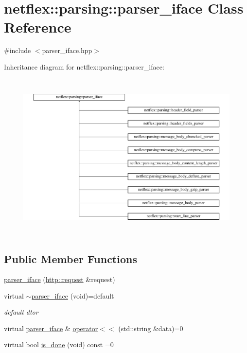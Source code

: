 \hypertarget{classnetflex_1_1parsing_1_1parser__iface}{}\section{netflex\+:\+:parsing\+:\+:parser\+\_\+iface Class Reference}
\label{classnetflex_1_1parsing_1_1parser__iface}


{\ttfamily \#include $<$parser\+\_\+iface.\+hpp$>$}

Inheritance diagram for netflex\+:\+:parsing\+:\+:parser\+\_\+iface\+:\begin{figure}[H]
\begin{center}
\leavevmode
\includegraphics[height=8.536586cm]{classnetflex_1_1parsing_1_1parser__iface}
\end{center}
\end{figure}
\subsection*{Public Member Functions}
\begin{DoxyCompactItemize}
\item 
\hyperlink{classnetflex_1_1parsing_1_1parser__iface_a3e1819d36fdab49c95da13c2411b1d21}{parser\+\_\+iface} (\hyperlink{classnetflex_1_1http_1_1request}{http\+::request} \&request)
\item 
\mbox{\label{classnetflex_1_1parsing_1_1parser__iface_a51f338717940ff98c19c0298c45a0daa}} 
virtual \hyperlink{classnetflex_1_1parsing_1_1parser__iface_a51f338717940ff98c19c0298c45a0daa}{$\sim$parser\+\_\+iface} (void)=default
\begin{DoxyCompactList}\small\item\em default dtor \end{DoxyCompactList}\item 
virtual \hyperlink{classnetflex_1_1parsing_1_1parser__iface}{parser\+\_\+iface} \& \hyperlink{classnetflex_1_1parsing_1_1parser__iface_a6b092567e70a5c0bf7568e94d06f7154}{operator$<$$<$} (std\+::string \&data)=0
\item 
virtual bool \hyperlink{classnetflex_1_1parsing_1_1parser__iface_afebd1cc50d5958f712dfac0c023fd162}{is\+\_\+done} (void) const =0
\end{DoxyCompactItemize}
